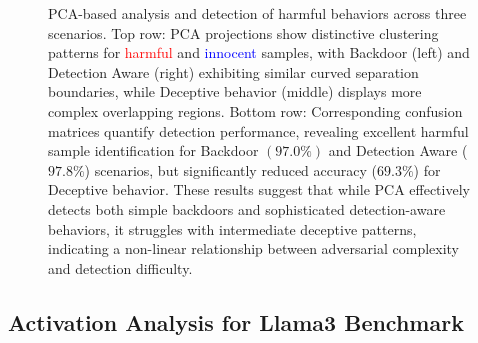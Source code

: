 \begin{figure}[htbp]
    \caption{PCA-based analysis and detection of harmful behaviors across three scenarios. Top row: PCA projections show distinctive clustering patterns for \textcolor{Red}{harmful} and \textcolor{Blue}{innocent} samples, with Backdoor (left) and Detection Aware (right) exhibiting similar curved separation boundaries, while Deceptive behavior (middle) displays more complex overlapping regions. Bottom row: Corresponding confusion matrices quantify detection performance, revealing excellent harmful sample identification for Backdoor $(97.0\%)$ and Detection Aware ($97.8\%$) scenarios, but significantly reduced accuracy ($69.3\%$) for Deceptive behavior. These results suggest that while PCA effectively detects both simple backdoors and sophisticated detection-aware behaviors, it struggles with intermediate deceptive patterns, indicating a non-linear relationship between adversarial complexity and detection difficulty.}
    \label{fig:l3actnspca}
\end{figure}



\clearpage


\subsection{Activation Analysis for Llama3 Benchmark} \label{sec:aall3b}



